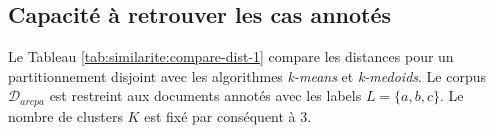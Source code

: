 \subsection{Capacité à retrouver les cas annotés}


Le Tableau \ref{tab:similarite:compare-dist-1} compare les distances pour un partitionnement disjoint avec les algorithmes \textit{k-means} et \textit{k-medoids}. Le corpus $\mathcal{D}_{arcpa}$ est restreint aux documents annotés avec les labels $L = \lbrace a, b, c \rbrace$. Le  nombre de clusters $K$ est fixé par conséquent à 3. %

